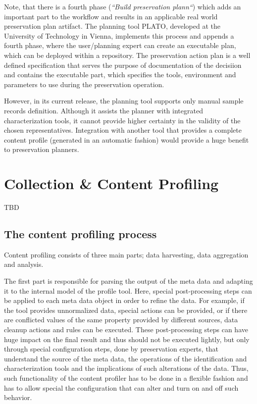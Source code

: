 Note, that there is a fourth phase (\textit{``Build preservation plann``}) which adds an important part to the workflow and results in an applicable real world preservation plan artifact. The planning tool PLATO, developed at the University of Technology in Vienna, implements this process and appends a fourth phase, where the user/planning expert can create an executable plan, which can be deployed within a repository. The preservation action plan is a well defined specification that serves the purpose of documentation of the decisiion and contains the executable part, which specifies the tools, environment and parameters to use during the preservation operation.

However, in its current release, the planning tool supports only manual sample records definition. Although it assists the planner with integrated characterization tools, it cannot provide higher certainty in the validity of the chosen representatives. Integration with another tool that provides a complete content profile (generated in an automatic fashion) would provide a huge benefit to preservation planners.

\section{Collection \& Content Profiling}
\label{sec:content_profiling}
TBD
\subsection{The content profiling process}
Content profiling consists of three main parts; data harvesting, data aggregation and analysis.

The first part is responsible for parsing the output of the meta data and adapting it to the internal model of the profile tool. Here, special post-processing steps can be applied to each meta data object in order to refine the data. For example, if the tool provides unnormalized data, special actions can be provided, or if there are conflicted values of the same property provided by different sources, data cleanup actions and rules can be executed. These post-processing steps can have huge impact on the final result and thus should not be executed lightly, but only through special configuration steps, done by preservation experts, that understand the source of the meta data, the operations of the identification and characterization tools and the implications of such alterations of the data. Thus, such functionality of the content profiler has to be done in a flexible fashion and has to allow special the configuration that can alter and turn on and off such behavior.

